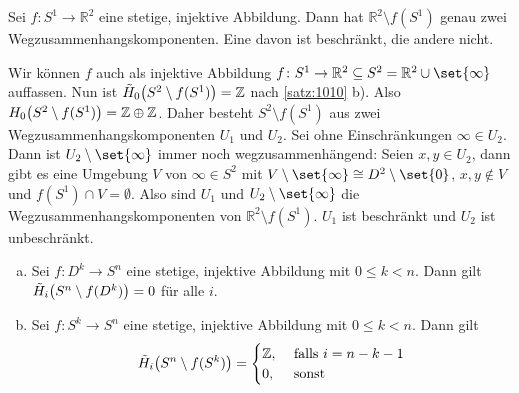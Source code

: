 \begin{satz}[{name={Jordanscher Kurvensatz}}]
	Sei $f \colon S^1 \to \mathbb{R}^2$ eine stetige, injektive Abbildung. 
	Dann hat $\mathbb{R}^2 \setminus f(S^1)$ genau zwei Wegzusammenhangskomponenten. 
	Eine davon ist beschränkt, die andere nicht.
\end{satz}
\begin{beweis}[{name={mit \ref{satz:1010}}}]
	Wir können $f$ auch als injektive Abbildung $f \colon S^1 \to \mathbb{R}^2 \subseteq S^2 = \mathbb{R}^2 \cup \set{\infty}$ auffassen. 
	Nun ist $\tilde{H}_0 \enbrace[\big]{S^2 \setminus f(S^1)} =\mathbb{Z}$ nach \autoref{satz:1010} b). 
	Also $H_0 \enbrace[\big]{S^2 \setminus f(S^1)}= \mathbb{Z} \oplus \mathbb{Z}$. 
	Daher besteht $S^2 \setminus f(S^1)$ aus zwei Wegzusammenhangskomponenten $U_1$ und $U_2$. 
	Sei ohne Einschränkungen $\infty \in U_2$. 
	Dann ist $U_2 \setminus \set{\infty}$ immer noch wegzusammenhängend: 
	Seien $x,y \in U_2$, dann gibt es eine Umgebung $V$ von $\infty \in S^2$ mit $V \setminus \set{\infty} \cong D^2 \setminus \set{0} $, $x,y \not\in V$ und $f(S^1) \cap V = \emptyset$. 
	Also sind $U_1$ und $U_2 \setminus \set{\infty}$ die Wegzusammenhangskomponenten von $\mathbb{R}^2 \setminus f(S^1)$. 
	$U_1$ ist beschränkt und $U_2$ ist unbeschränkt.
\end{beweis}

\begin{satz}[{name=[{Homologie von $S^n$ ohne Einbettung vonScheiben $D^k$ und Sphären $S^k$ mit $k<n$}]},label=satz:1010]
	\leavevmode
	\begin{enumerate}[a),itemsep=1pt]
		\item Sei $f \colon D^k \to S^n$ eine stetige, injektive Abbildung mit $0 \le k < n$. Dann gilt $\tilde{H}_i\enbrace[\big]{S^n \setminus f(D^k)} =0$ für alle $i$.
		\item Sei $f \colon S^k \to S^n$ eine stetige, injektive Abbildung mit $0 \le k < n$. Dann gilt 
		\[
			\tilde{H}_i \enbrace[\big]{S^n \setminus f(S^k)} = \begin{cases}
				\mathbb{Z}, &\text{ falls }i=n-k-1\\
				0, &\text{ sonst}
			\end{cases}
		\]
	\end{enumerate}
\end{satz}

